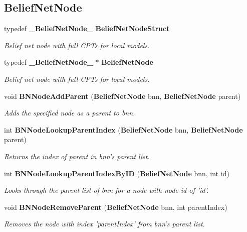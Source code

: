 \subsection*{Belief\-Net\-Node}
\begin{CompactItemize}
\item 
typedef {\bf \_\-Belief\-Net\-Node\_\-} {\bf Belief\-Net\-Node\-Struct}
\begin{CompactList}\small\item\em Belief net node with full CPTs for local models. \item\end{CompactList}\item 
typedef {\bf \_\-Belief\-Net\-Node\_\-} $\ast$ {\bf Belief\-Net\-Node}
\begin{CompactList}\small\item\em Belief net node with full CPTs for local models. \item\end{CompactList}\item 
void {\bf BNNode\-Add\-Parent} ({\bf Belief\-Net\-Node} bnn, {\bf Belief\-Net\-Node} parent)
\begin{CompactList}\small\item\em Adds the specified node as a parent to bnn. \item\end{CompactList}\item 
int {\bf BNNode\-Lookup\-Parent\-Index} ({\bf Belief\-Net\-Node} bnn, {\bf Belief\-Net\-Node} parent)
\begin{CompactList}\small\item\em Returns the index of parent in bnn's parent list. \item\end{CompactList}\item 
int {\bf BNNode\-Lookup\-Parent\-Index\-By\-ID} ({\bf Belief\-Net\-Node} bnn, int id)
\begin{CompactList}\small\item\em Looks through the parent list of bnn for a node with node id of 'id'. \item\end{CompactList}\item 
void {\bf BNNode\-Remove\-Parent} ({\bf Belief\-Net\-Node} bnn, int parent\-Index)
\begin{CompactList}\small\item\em Removes the node with index 'parent\-Index' from bnn's parent list. \item\end{CompactList}\item 

\end{CompactItemize}
